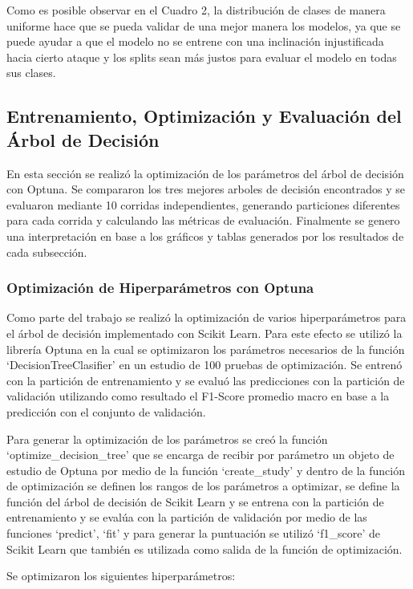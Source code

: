 \documentclass[12pt,a4paper]{article}
\begin{document}
Como es posible observar en el Cuadro 2, la distribución de clases de manera uniforme hace que se pueda
validar de una mejor manera los modelos, ya que se puede ayudar a que el modelo no se entrene
con una inclinación injustificada hacia cierto ataque y los splits sean más justos para evaluar el modelo en todas
sus clases.

\subsection{Entrenamiento, Optimización y Evaluación del Árbol de Decisión}

En esta sección se realizó la optimización de los parámetros del árbol de decisión con Optuna.
Se compararon los tres mejores arboles de decisión encontrados y se evaluaron mediante 10 corridas independientes,
generando particiones diferentes para cada corrida y calculando las métricas de evaluación. Finalmente se genero
una interpretación en base a los gráficos y tablas generados por los resultados de cada subsección.

\subsubsection{Optimización de Hiperparámetros con Optuna}

Como parte del trabajo se realizó la optimización de varios hiperparámetros para el árbol de decisión implementado con Scikit Learn.
Para este efecto se utilizó la librería Optuna en la cual se optimizaron los parámetros necesarios de la función `DecisionTreeClasifier' en
un estudio de 100 pruebas de optimización. Se entrenó con la partición de entrenamiento y se evaluó las predicciones con la partición de validación
utilizando como resultado el F1-Score promedio macro en base a la predicción con el conjunto de validación.

Para generar la optimización de los parámetros se creó la función `optimize_decision_tree' que se encarga de recibir por
parámetro un objeto de estudio de Optuna por medio de la función `create_study' y dentro de la función
de optimización se definen los rangos de los parámetros a optimizar,
se define la función del árbol de decisión de Scikit Learn y se entrena
con la partición de entrenamiento y se evalúa con la partición de validación
por medio de las funciones `predict', `fit' y
para generar la puntuación se utilizó `f1_score' de Scikit Learn que también
es utilizada como salida de la función de optimización.

Se optimizaron los siguientes hiperparámetros:
\end{document}
